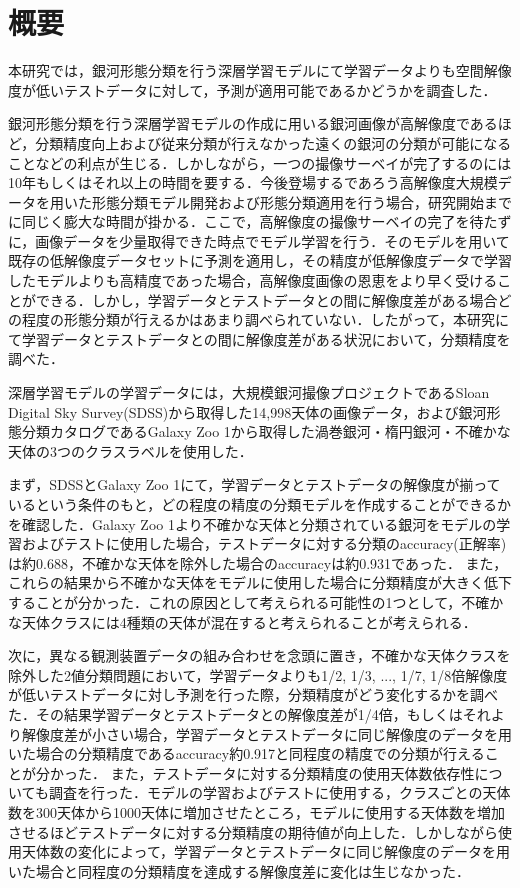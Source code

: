 \documentclass[a4j, 11pt]{jreport}
\begin{document}
\chapter*{概要}
本研究では，銀河形態分類を行う深層学習モデルにて学習データよりも空間解像度が低いテストデータに対して，予測が適用可能であるかどうかを調査した．

銀河形態分類を行う深層学習モデルの作成に用いる銀河画像が高解像度であるほど，分類精度向上および従来分類が行えなかった遠くの銀河の分類が可能になることなどの利点が生じる．しかしながら，一つの撮像サーベイが完了するのには10年もしくはそれ以上の時間を要する．今後登場するであろう高解像度大規模データを用いた形態分類モデル開発および形態分類適用を行う場合，研究開始までに同じく膨大な時間が掛かる．ここで，高解像度の撮像サーベイの完了を待たずに，画像データを少量取得できた時点でモデル学習を行う．そのモデルを用いて既存の低解像度データセットに予測を適用し，その精度が低解像度データで学習したモデルよりも高精度であった場合，高解像度画像の恩恵をより早く受けることができる．しかし，学習データとテストデータとの間に解像度差がある場合どの程度の形態分類が行えるかはあまり調べられていない．したがって，本研究にて学習データとテストデータとの間に解像度差がある状況において，分類精度を調べた．

深層学習モデルの学習データには，大規模銀河撮像プロジェクトであるSloan Digital Sky Survey(SDSS)から取得した14,998天体の画像データ，および銀河形態分類カタログであるGalaxy Zoo 1から取得した渦巻銀河・楕円銀河・不確かな天体の3つのクラスラベルを使用した．

まず，SDSSとGalaxy Zoo 1にて，学習データとテストデータの解像度が揃っているという条件のもと，どの程度の精度の分類モデルを作成することができるかを確認した．Galaxy Zoo 1より不確かな天体と分類されている銀河をモデルの学習およびテストに使用した場合，テストデータに対する分類のaccuracy(正解率)は約0.688，不確かな天体を除外した場合のaccuracyは約0.931であった．
また，これらの結果から不確かな天体をモデルに使用した場合に分類精度が大きく低下することが分かった．これの原因として考えられる可能性の1つとして，不確かな天体クラスには4種類の天体が混在すると考えられることが考えられる．


次に，異なる観測装置データの組み合わせを念頭に置き，不確かな天体クラスを除外した2値分類問題において，学習データよりも1/2, 1/3, ..., 1/7, 1/8倍解像度が低いテストデータに対し予測を行った際，分類精度がどう変化するかを調べた．その結果学習データとテストデータとの解像度差が1/4倍，もしくはそれより解像度差が小さい場合，学習データとテストデータに同じ解像度のデータを用いた場合の分類精度であるaccuracy約0.917と同程度の精度での分類が行えることが分かった．
また，テストデータに対する分類精度の使用天体数依存性についても調査を行った．モデルの学習およびテストに使用する，クラスごとの天体数を300天体から1000天体に増加させたところ，モデルに使用する天体数を増加させるほどテストデータに対する分類精度の期待値が向上した．しかしながら使用天体数の変化によって，学習データとテストデータに同じ解像度のデータを用いた場合と同程度の分類精度を達成する解像度差に変化は生じなかった．
\end{document}
